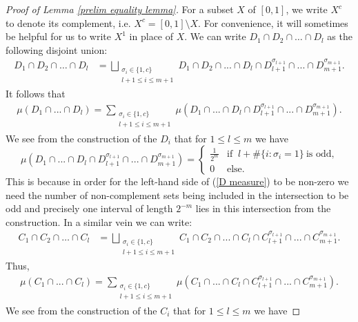 \documentclass[12pt]{article}
\begin{document}
\begin{proof}[Proof of Lemma \ref{prelim equality lemma}]
For a subset $X$ of $[0,1]$, we write $X^c$ to denote its complement, i.e. $X^c=[0,1]\setminus X$. For convenience, it will sometimes be helpful for us to write $X^1$ in place of $X$. We can write $D_1 \cap D_2 \cap \dots \cap D_l$ as the following disjoint union:
 \begin{align*}
     D_1 \cap D_2 \cap \dots \cap D_l &= \bigsqcup_{\substack{\sigma_i \in \{1,c\} \\ l+1 \leq i \leq m+1}} D_1 \cap D_2 \cap ...\cap D_l \cap D_{l+1}^{\sigma_{l+1}} \cap ... \cap D_{m+1}^{\sigma_{m+1}}. 
 \end{align*}
It follows that 
    \begin{align}\label{D decompose}
        \mu(D_1 \cap...\cap D_l)=\sum_{\substack{\sigma_i \in \{1,c\} \\ l+1 \leq i \leq m+1}} \mu\left(D_1\cap...\cap D_l \cap D_{l+1}^{\sigma_{l+1}} \cap ...\cap D_{m+1}^{\sigma_{m+1}} \right).
    \end{align}
We see from the construction of the $D_i$ that for $1 \leq l \leq m$ we have
\begin{equation}\label{D measure}
\mu\left(D_1\cap...\cap D_l \cap D_{l+1}^{\sigma_{l+1}} \cap ... \cap D_{m+1}^{\sigma_{m+1}}\right)=
    \begin{cases}
        \frac{1}{2^m}  & \text{if } ~ l+ \#\{i:\sigma_i=1\} ~\text{is odd,}\\
        0 & \text{else. }
    \end{cases}
\end{equation}
This is because in order for the left-hand side of (\ref{D measure}) to be non-zero we need the number of non-complement sets being included in the intersection to be odd and precisely one interval of length $2^{-m}$ lies in this intersection from the construction.
In a similar vein we can write:
\begin{align*}
     C_1 \cap C_2 \cap \dots \cap C_l &= \bigsqcup_{\substack{\sigma_i \in \{1,c\} \\ l+1 \leq i \leq m+1}} C_1 \cap C_2 \cap ...\cap C_l \cap C_{l+1}^{\sigma_{l+1}} \cap ... \cap C_{m+1}^{\sigma_{m+1}}. 
 \end{align*} 
 Thus,
\begin{align}\label{C decompose}
    \mu\left(C_1 \cap...\cap C_l\right)=\sum_{\substack{\sigma_i \in \{1,c\} \\ l+1 \leq i \leq m+1}} \mu\left(C_1\cap...\cap C_l \cap C_{l+1}^{\sigma_{l+1}} \cap ...\cap C_{m+1}^{\sigma_{m+1}}\right).
\end{align}
We see from the construction of the $C_i$ that for $1 \leq l \leq m$ we have

\end{proof}
\end{document}
